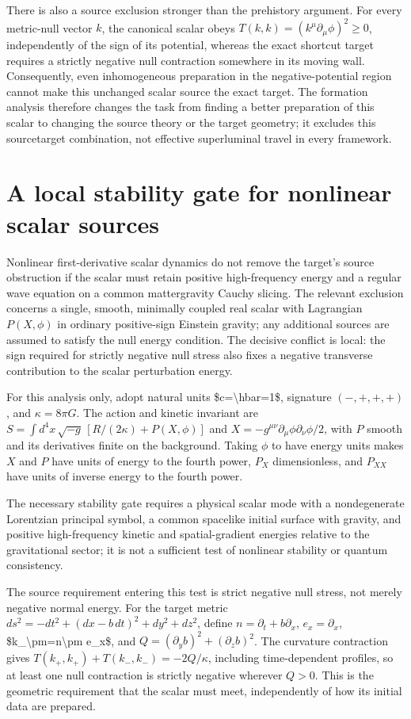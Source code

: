 \documentclass[11pt]{article}
\begin{document}
There is also a source exclusion stronger than the prehistory argument. For every metric-null vector $k$, the canonical scalar obeys $T(k,k)=(k^\mu\partial_\mu\phi)^2\geq0$, independently of the sign of its potential, whereas the exact shortcut target requires a strictly negative null contraction somewhere in its moving wall. Consequently, even inhomogeneous preparation in the negative-potential region cannot make this unchanged scalar source the exact target. The formation analysis therefore changes the task from finding a better preparation of this scalar to changing the source theory or the target geometry; it excludes this source\textendash{}target combination, not effective superluminal travel in every framework.

\section{A local stability gate for nonlinear scalar sources}
Nonlinear first-derivative scalar dynamics do not remove the target\textquoteright{}s source obstruction if the scalar must retain positive high-frequency energy and a regular wave equation on a common matter\textendash{}gravity Cauchy slicing. The relevant exclusion concerns a single, smooth, minimally coupled real scalar with Lagrangian $P(X,\phi)$ in ordinary positive-sign Einstein gravity; any additional sources are assumed to satisfy the null energy condition. The decisive conflict is local: the sign required for strictly negative null stress also fixes a negative transverse contribution to the scalar perturbation energy.

For this analysis only, adopt natural units \$c=\textbackslash{}hbar=1\$, signature $(-,+,+,+)$, and $\kappa=8\pi G$. The action and kinetic invariant are $S=\int d^4x\,\sqrt{-g}\,[R/(2\kappa)+P(X,\phi)]$ and $X=-g^{\mu\nu}\partial_\mu\phi\partial_\nu\phi/2$, with $P$ smooth and its derivatives finite on the background. Taking $\phi$ to have energy units makes $X$ and $P$ have units of energy to the fourth power, $P_X$ dimensionless, and $P_{XX}$ have units of inverse energy to the fourth power.

The necessary stability gate requires a physical scalar mode with a nondegenerate Lorentzian principal symbol, a common spacelike initial surface with gravity, and positive high-frequency kinetic and spatial-gradient energies relative to the gravitational sector; it is not a sufficient test of nonlinear stability or quantum consistency.

The source requirement entering this test is strict negative null stress, not merely negative normal energy. For the target metric $ds^2=-dt^2+(dx-b\,dt)^2+dy^2+dz^2$, define $n=\partial_t+b\partial_x$, $e_x=\partial_x$, \$k\_\textbackslash{}pm=n\textbackslash{}pm e\_x\$, and $Q=(\partial_y b)^2+(\partial_z b)^2$. The curvature contraction gives $T(k_+,k_+)+T(k_-,k_-)=-2Q/\kappa$, including time-dependent profiles, so at least one null contraction is strictly negative wherever $Q>0$. This is the geometric requirement that the scalar must meet, independently of how its initial data are prepared.
\end{document}
